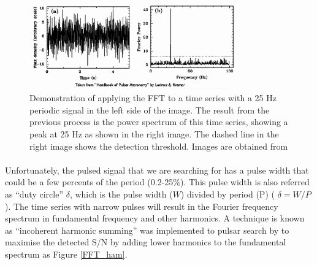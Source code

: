 \documentclass[thesis_msc.tex]{subfiles}
\begin{document}
 \begin{figure}[h]
\centering
\includegraphics[width=0.80\textwidth]{figures/FFT}
\caption{Demonstration of applying the FFT to a time series with a 25 Hz periodic signal in the left side of the image. The result from the previous process is the power spectrum of this time series, showing a peak at 25 Hz as shown in the right image. The dashed line in the right image shows the detection threshold. Images are obtained from \citep{handbook}}
\label{FFT_im}
\end{figure}
\paragraph{} Unfortunately, the pulsed signal that we are searching for has a pulse width that could be a few percents of the period (0.2-25$\%$). This pulse width is also referred as ``duty circle'' $\delta$, which is the pulse width ($W$) divided by period (P) ( $\delta=W/P$). The time series with narrow pulses will result in the Fourier frequency spectrum in fundamental frequency and other harmonics. A technique is known as ``incoherent harmonic summing'' was implemented to pulsar search by \cite{taylor1969two} to maximise the detected S/N by adding lower harmonics to the fundamental spectrum as Figure \ref{FFT_ham}.
\end{document}
